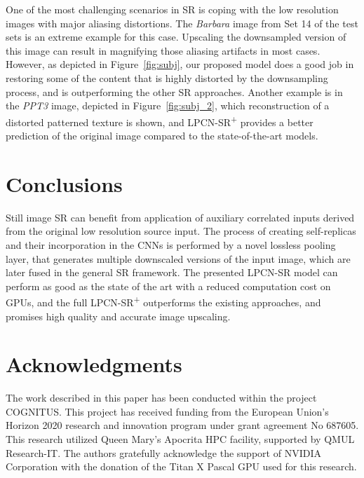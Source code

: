 \documentclass[10pt,twocolumn,letterpaper]{article}
\begin{document}
One of the most challenging scenarios in SR is coping with the low resolution images with major aliasing 
distortions. The \emph{Barbara} image from Set 14 of the test sets is an extreme example for this case. Upscaling 
the downsampled version of this image can result in magnifying those aliasing artifacts in most cases. However, as
depicted in Figure~\ref{fig:subj}, our proposed model does a good job in restoring some of the content that is
highly distorted by the downsampling process, and is outperforming the other SR approaches. Another example is
in the \emph{PPT3} image, depicted in Figure~\ref{fig:subj_2}, which reconstruction of a distorted patterned 
texture is shown, and LPCN-SR\textsuperscript{+} provides a better prediction of the original image compared to 
the state-of-the-art models.


\section{Conclusions}
\label{conc}
Still image SR can benefit from application of auxiliary correlated inputs derived from the 
original low resolution source input. The process of creating self-replicas and their incorporation in 
the CNNs is performed by a novel lossless pooling layer, that generates multiple downscaled
versions of the input image, which are later fused in the general SR framework. The presented
LPCN-SR model can perform as good as the state of the art with a reduced computation cost on 
GPUs, and the full LPCN-SR\textsuperscript{+} outperforms the existing approaches, and promises
high quality and accurate image upscaling.

\section*{Acknowledgments}
The work described in this paper has been conducted within the project
COGNITUS. This project has received funding from the European Union’s
Horizon 2020 research and innovation program under grant agreement No
687605. This research utilized Queen Mary's Apocrita HPC facility,
supported by QMUL Research-IT. The authors gratefully acknowledge the support of NVIDIA 
Corporation with the donation of the Titan X Pascal GPU used for this research.


{\small


}
\end{document}
